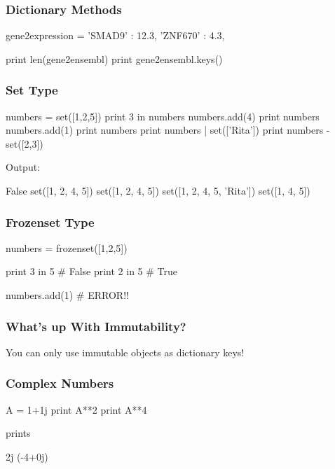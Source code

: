 \begin{frame}[fragile]
\frametitle{Dictionary Methods}

\begin{python}
gene2expression = {
    'SMAD9' : 12.3,
    'ZNF670' : 4.3,
}
    
print len(gene2ensembl)
print gene2ensembl.keys()
\end{python}


\end{frame}

\begin{frame}[fragile]
\frametitle{Set Type}
\begin{python}
numbers = set([1,2,5])
print 3 in numbers
numbers.add(4)
print numbers
numbers.add(1)
print numbers
print numbers | set(['Rita'])
print numbers - set([2,3])
\end{python}

Output:
\begin{python}
False
set([1, 2, 4, 5])
set([1, 2, 4, 5])
set([1, 2, 4, 5, 'Rita'])
set([1, 4, 5])
\end{python}

\end{frame}

\begin{frame}[fragile]
\frametitle{Frozenset Type}

\begin{python}
numbers = frozenset([1,2,5])

print 3 in 5 # False
print 2 in 5 # True

numbers.add(1) # ERROR!!
\end{python}

\end{frame}

\begin{frame}[fragile]
\frametitle{What's up With Immutability?}

\pause
You can only use \alert{immutable} objects as dictionary keys!

\end{frame}

\begin{frame}[fragile]
\frametitle{Complex Numbers}
\begin{python}
A = 1+1j
print A**2
print A**4
\end{python}

prints

\begin{python}
2j
(-4+0j)
\end{python}
\end{frame}


